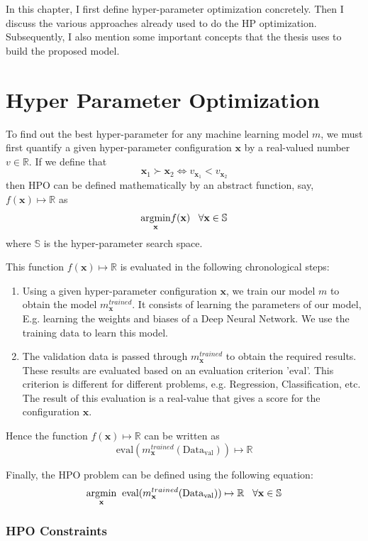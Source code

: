 \documentclass[11pt]{report}
\begin{document}
In this chapter, I first define hyper-parameter optimization concretely.
Then I discuss the various approaches already used to do the HP optimization.
Subsequently, I also mention some important concepts that the thesis uses to build the proposed model.

\section{Hyper Parameter Optimization}
To find out the best hyper-parameter for any machine learning model $m$, we must first quantify a given hyper-parameter configuration $\textbf{x}$ by a real-valued number $v \in \mathbb{R}$.
If we define that
$$
\textbf{x}_1 \succ  \textbf{x}_2 \iff v_{\textbf{x}_1} < v_{\textbf{x}_2}
$$
then HPO can be defined mathematically by an abstract function, say,  $f(\textbf{x}) \mapsto \mathbb{R}$ as
$$
     \underset{\rm \textbf{x}}{\rm argmin}  f(\textbf{x}) \;\;\;  \forall \textbf{x} \in \mathbb{S}
$$
where $\mathbb{S}$ is the hyper-parameter search space.

This function $f(\textbf{x}) \mapsto \mathbb{R}$ is evaluated in the following chronological steps:
\begin{enumerate}
\item Using a given hyper-parameter configuration $\textbf{x}$,  we train our model $m$ to obtain the model $m^{trained}_\textbf{x}$. It consists of learning the parameters of our model, E.g. learning the weights and biases of a Deep Neural Network.
We use the training data to learn this model.
\item The validation data is passed through $m^{trained}_\textbf{x}$ to obtain the required results.
These results are evaluated based on an evaluation criterion '$\textrm{eval}$'. This criterion is different for different problems, e.g. Regression, Classification, etc.
The result of this evaluation is a real-value that gives a score for the configuration $\textbf{x}$.
\end{enumerate}

Hence the function $f(\textbf{x}) \mapsto \mathbb{R}$ can be written as 
$$
\textrm{eval}(m^{trained}_\textbf{x} (\textrm{Data}_\textrm{val})) \mapsto \mathbb{R}
$$

Finally, the HPO problem can be defined using the following equation:
$$
\underset{\rm \textbf{x}}{\rm argmin} \;\; \textrm{eval}(m^{trained}_\textbf{x} (\textrm{Data}_\textrm{val})) \mapsto \mathbb{R}   \;\;\;  \forall \textbf{x} \in \mathbb{S}
$$

\subsubsection{HPO Constraints}
\end{document}
